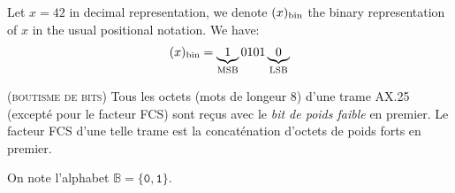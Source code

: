 \documentclass[twocolumn,pre,floats,aps,amsmath,amssymb]{revtex4}
\newenvironment{example}[1][Exemple.]{\begin{trivlist}
\item[\hskip \labelsep {\bfseries #1}]}{\end{trivlist}}
\newenvironment{remark}[1][Remarque.]{\begin{trivlist}
\item[\hskip \labelsep {\bfseries #1}]}{\end{trivlist}}
\begin{document}
\begin{example}
  Let $x = 42$ in decimal representation, we denote $(x)_{\textup{bin}}$ the binary representation of $x$ in the usual positional notation. We have:
  \begin{eqnarray*}
    (x)_{\textup{bin}} = \underbrace{1}_{\textup{MSB}}0101\underbrace{0}_{\textup{LSB}}
  \end{eqnarray*}

\end{example}

\begin{remark}
  (\textsc{boutisme de bits})
  Tous les octets (mots de longeur 8) d'une trame AX.25 (except\'e pour le facteur FCS) sont re\c{c}us avec le \textit{bit de poids faible} en premier\cite{IITB}. Le facteur FCS d'une telle trame est la concat\'enation d'octets de poids forts en premier.
\end{remark}

On note l'alphabet $\mathbb{B} = \{\texttt{0}, \texttt{1}\}$.
\end{document}
